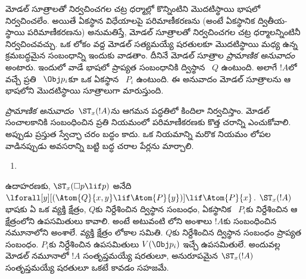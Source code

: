 \documentclass[../../../include/open-logic-section]{subfiles}
\begin{document}


మోడల్ సూత్రాలతో నిర్వచించగల చట్ర ధర్మాల్లో కొన్నింటిని
మొదటిస్థాయి భాషలో నిర్వచించలేం. అయితే ఏకస్థాన విధేయాలపై
పరిమాణీకరణను (అంటే ఏకస్థానిక ద్వితీయ-స్థాయి పరిమాణీకరణను)
అనుమతిస్తే, మోడల్ సూత్రాలతో నిర్వచించగల చట్ర ధర్మాలన్నింటినీ
నిర్వచించవచ్చు. ఒక లోకం వద్ద మోడల్
 సత్యమయ్యే షరతులకూ
మొదటిస్థాయి  మధ్య ఉన్న
క్రమబద్ధమైన సంబంధాన్ని ఇందుకు వాడతాం. దీనినే మోడల్
సూత్రాల \emph{ప్రామాణిక అనువాదం} అంటారు. ఇందులో వాడే భాషలో
ప్రాప్యత సంబంధానికి ద్విస్థాన ~$Q$
ఉంటుంది. అలాగే $!A$లో వచ్చే ప్రతి
~$\Obj p_i$కూ
ఒక ఏకస్థాన ~$P_i$ ఉంటుంది.
ఈ అనువాదం మోడల్ సూత్రాలను ఆ భాషలోని మొదటిస్థాయి
సూత్రాలుగా మారుస్తుంది.

\begin{defn}
  \emph{ప్రామాణిక అనువాదం}~$\ST_x(!A)$ను ఆగమన
  పద్ధతిలో కిందిలా నిర్వచిస్తాం. మోడల్ సంచాలకానికి సంబంధించిన
  ప్రతి నియమంలో పరిమాణీకరణకు కొత్త చరాన్ని ఎంచుకోవాలి.
  అప్పుడు ప్రస్తుత స్వేచ్ఛా చరం బద్ధం కాదు. ఒక నియమాన్ని మరొక
  నియమం లోపల వాడినప్పుడు అవసరాన్ని బట్టి బద్ధ చరాల పేర్లను మార్చాలి.
  \begin{enumerate}
  \item {}
  \end{enumerate}
\end{defn}

ఉదాహరణకు, $\ST_x(\Box p \lif p)$ అనేది $\lforall[y][(\Atom{Q}{x,y}
  \lif \Atom{P}{y})] \lif \Atom{P}{x}$. $\ST_x(!A)$ భాషకు
ఏ  ఒక వ్యక్తి క్షేత్రం,
$Q$కు నిర్దేశించిన ద్విస్థాన సంబంధం, ఏకస్థానిక
~$P_i$కు
నిర్దేశించిన ఆ క్షేత్రంలోని ఉపసమితులు కావాలి. అంటే అటువంటి
లోని అంశాలు
$!A$కు సంబంధించిన నమూనాలోని అంశాలే. వ్యక్తి క్షేత్రం లోకాల సమితి.
$Q$కు నిర్దేశించిన ద్విస్థాన సంబంధం ప్రాప్యత సంబంధం.
$P_i$కు నిర్దేశించిన ఉపసమితులు $V(\Obj p_i)$ ఇచ్చే
ఉపసమితులే. అందువల్ల మోడల్ నమూనాలో $!A$ సంతృప్తమయ్యే
షరతులూ, అనురూపమైన 
$\ST_x(!A)$ సంతృప్తమయ్యే షరతులూ ఒకటే కావడం సహజమే.
\end{document}
